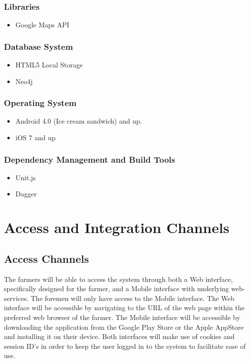 \documentclass[11pt,fleqn]{book} %
\begin{document}
	\subsection{Libraries}
	\begin{itemize}
		\item Google Maps API
	\end{itemize}			
	\subsection{Database System}
	\begin{itemize}
		\item HTML5 Local Storage
		\item Neo4j
	\end{itemize}
	\subsection{Operating System}
	\begin{itemize}
		\item Android 4.0 (Ice cream sandwich) and up.
		\item iOS 7 and up
	\end{itemize}
	\subsection{Dependency Management and Build Tools}
	\begin{itemize}
		\item Unit.js
		\item Dagger
	\end{itemize}
	
	
	
	
	\chapter{Access and Integration Channels}
	
	\section{Access Channels}
	
	The farmers will be able to access the system through both a Web interface, specifically designed for the farmer, and a Mobile interface with underlying web-services. The foremen will only have access to the Mobile interface. The Web interface will be accessible by navigating to the URL of the web page within the preferred web browser of the farmer. The Mobile interface will be accessible by downloading the application from the Google Play Store or the Apple AppStore and installing it on their device. Both interfaces will make use of cookies and session ID’s in order to keep the user logged in to the system to facilitate ease of use.
	
\end{document}
